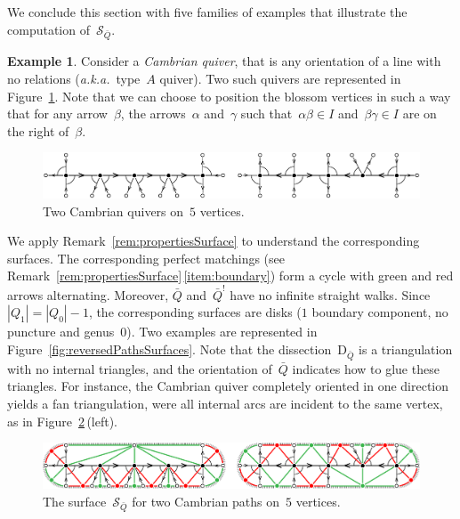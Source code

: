 \documentclass{amsart}
\theoremstyle{definition}
\newtheorem{example}[theorem]{Example}
\newcommand{\fref}[1]{Figure~\ref{#1}} %
\newcommand{\aka}{\textit{a.k.a.}~} %
\newcommand{\darkblue}{\color{darkblue}} %
\newcommand{\defn}[1]{\textsl{\darkblue #1}} %
\newcommand{\surface}{\mathcal{S}} %
\newcommand{\dissection}{\mathrm{D}} %
\newcommand{\koszul}{^!} %
\begin{document}
We conclude this section with five families of examples that illustrate the computation of~$\surface_{\bar Q}$.

\begin{example}
\label{exm:CambrianPath}
Consider a \defn{Cambrian quiver}, that is any orientation of a line with no relations (\aka type~$A$ quiver).
Two such quivers are represented in \fref{fig:CambrianPathsQuivers}.
Note that we can choose to position the blossom vertices in such a way that for any arrow~$\beta$, the arrows~$\alpha$ and~$\gamma$ such that~$\alpha\beta \in I$ and~$\beta\gamma \in I$ are on the right of~$\beta$.

\begin{figure}[h]
	\capstart
	\centerline{\includegraphics[scale=.45]{CambrianPathsQuivers}}
	\caption{Two Cambrian quivers on~$5$ vertices.}
	\label{fig:CambrianPathsQuivers}
\end{figure}

We apply Remark~\ref{rem:propertiesSurface} to understand the corresponding surfaces.
The corresponding perfect matchings (see Remark~\ref{rem:propertiesSurface}\,\eqref{item:boundary}) form a cycle with green and red arrows alternating.
Moreover, $\bar Q$ and~$\bar Q\koszul$ have no infinite straight walks.
Since~$|Q_1| = |Q_0|-1$, the corresponding surfaces are disks ($1$ boundary component, no puncture and genus~$0$).
Two examples are represented in \fref{fig:reversedPathsSurfaces}.
Note that the dissection~$\dissection_{\bar Q}$ is a triangulation with no internal triangles, and the orientation of~$\bar Q$ indicates how to glue these triangles.
For instance, the Cambrian quiver completely oriented in one direction yields a fan triangulation, were all internal arcs are incident to the same vertex, as in \fref{fig:CambrianPathsSurfaces}\,(left).

\begin{figure}[h]
	\capstart
	\centerline{\includegraphics[scale=.7]{CambrianPathsSurfaces}}
	\caption{The surface~$\surface_{\bar Q}$ for two Cambrian paths on~$5$ vertices.}
	\label{fig:CambrianPathsSurfaces}
\end{figure}
\end{example}
\end{document}

